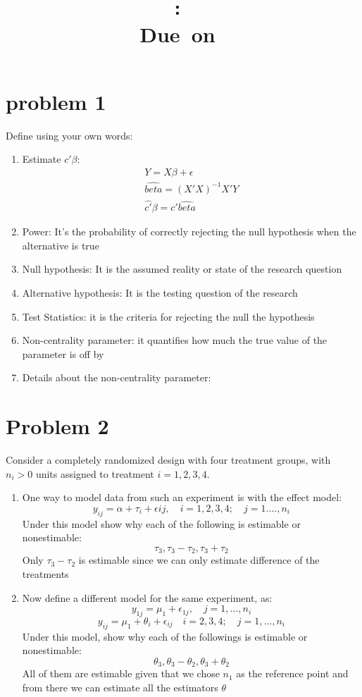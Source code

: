 \documentclass{article}
\title{
	\vspace{2in}
	\textmd{\textbf{\hmwkClass:\ \hmwkTitle}}\\
	\normalsize\vspace{0.1in}\small{Due\ on\ \hmwkDueDate}\\
	\vspace{0.1in}\large{\textit{\hmwkClassInstructor}}
	\vspace{3in}
}
\author{\hmwkAuthorName}
\date{}
\begin{document}
\maketitle
\pagebreak
\tableofcontents
\pagebreak

\section{problem 1}
Define using your own words:
\begin{enumerate}
	\item Estimate $c'\beta$:
	      \[
		      \begin{split}
			      Y = X\beta + \epsilon      \\
			      \hat{beta} = (X'X)^{-1}X'Y \\
			      \hat{c'}\beta = c'\hat{beta}
		      \end{split}
	      \]
	\item Power: It's the probability of correctly rejecting the null hypothesis when the alternative is true
	\item Null hypothesis: It is the assumed reality or state of the research question
	\item Alternative hypothesis: It is the testing question of the research
	\item Test Statistics: it is the criteria for rejecting the null the hypothesis
	\item Non-centrality parameter: it quantifies how much the true value of the parameter is off by
	\item Details about the non-centrality parameter:
\end{enumerate}

\section{Problem 2}
Consider a completely randomized design with four treatment groups, with $n_i>0$ units assigned to treatment $i=1,2,3,4$.
\begin{enumerate}
	\item One way to model data from such an experiment is with the effect model:
	      $$
		      y_{ij}=\alpha + \tau_i + \epsilon{ij}, \quad i=1,2,3,4; \quad j= 1.\ldots, n_i
	      $$
	      Under this model show why each of the following is estimable or nonestimable:
	      $$
		      \tau_3, \tau_3 - \tau_2, \tau_3 + \tau_2
	      $$
	      Only $\tau_3 - \tau_2$ is estimable since we can only estimate difference of the treatments
	\item Now define a different model for the same experiment, as:
	      $$
		      y_{1j}= \mu_1 + \epsilon_{1j}, \quad j=1,\ldots,n_i
	      $$
	      $$
		      y_{ij}= \mu_1 + \theta_i + \epsilon_{ij} \quad i=2,3,4; \quad j=1,\ldots,n_i
	      $$
	      Under this model, show why each of the followings is estimable or nonestimable:
	      $$
		      \theta_3,\theta_3-\theta_2, \theta_3 + \theta_2
	      $$
	      All of them are estimable given that we chose $n_1$ as the reference point and from there we can estimate all the estimators $\theta$
\end{enumerate}
\end{document}

